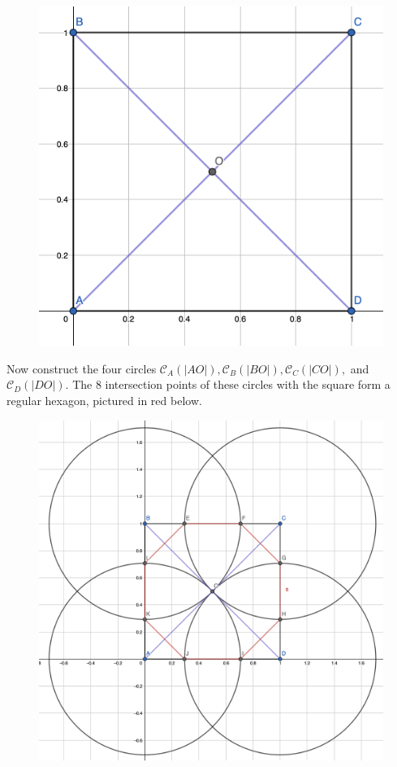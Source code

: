 \documentclass[twoside,10pt]{article}
\begin{document}
\begin{figure}[H]
	\centering
	\includegraphics[scale=0.3]{fig/16a}
\end{figure}

Now construct the four circles $\mathcal{C}_{A}(|AO|), \mathcal{C}_{B}(|BO|), \mathcal{C}_{C}(|CO|),$ and $\mathcal{C}_{D}(|DO|)$. The 8 intersection points of these circles with the square form a regular hexagon, pictured in red below.

\begin{figure}[H]
	\centering
	\includegraphics[scale=0.3]{fig/16b}
\end{figure}
\end{document}
